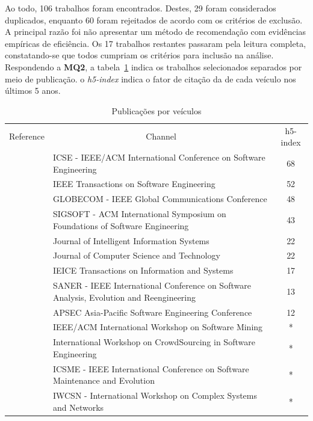 \documentclass[12pt,openany,oneside,a4paper,english,brazil]{abntbibufjf}
\begin{document}
Ao todo, 106 trabalhos foram encontrados. Destes, 29 foram considerados duplicados, enquanto 60 foram rejeitados de acordo com os critérios de exclusão. A principal razão foi não apresentar um método de recomendação com evidências empíricas de eficiência. Os 17 trabalhos restantes passaram pela leitura completa, constatando-se que todos cumpriam os critérios para inclusão na análise. Respondendo a \textbf{MQ2}, a tabela~\ref{tab:papersperchannel} indica os trabalhos selecionados separados por meio de publicação. o \textit{h5-index} indica o fator de citação da de cada veículo nos últimos 5 anos.


\begin{table}[!htbp]
  \tiny
  \begin{center}
  \caption{Publicações por veículos }
  \label{tab:papersperchannel}
    \begin{tabularx}{\textwidth}{cXc}
    \hline\noalign{\smallskip}
    Reference         & \multicolumn{1}{c}{Channel} & h5-index \\
    \noalign{\smallskip}
    \hline
    \noalign{\smallskip}
    \cite{rahman2016}\cite{balachandran2013}  & ICSE - IEEE/ACM International Conference on Software Engineering & 68                                  \\
    \cite{zanjani2016} & IEEE Transactions on Software Engineering & 52 \\
    \cite{liao2017} & GLOBECOM - IEEE Global Communications Conference & 48 \\
    \cite{costa2016} & SIGSOFT - ACM International Symposium on Foundations of Software Engineering & 43 \\
    \cite{fejzer2017} & Journal of Intelligent Information Systems  & 22 \\
    \cite{jiang2015} & Journal of Computer Science and Technology & 22\\
    \cite{yang2016} &  IEICE Transactions on Information and Systems & 17 \\
    \cite{Thongtanunam2015-1}  & SANER - IEEE International Conference on Software Analysis, Evolution and Reengineering & 13                                 \\
    \cite{yu2014,lee2013} & APSEC Asia-Pacific Software Engineering Conference & 12  \\
    \cite{xia2017} & IEEE/ACM International Workshop on Software Mining & * \\
    \cite{ying2016} &  International Workshop on CrowdSourcing in Software Engineering & *\\
    \cite{yu2014-2}\cite{xia2015}\cite{ouni2016} & ICSME -  IEEE International Conference on Software Maintenance and Evolution  & *\\
    \cite{fu2017} & IWCSN - International Workshop on Complex Systems and Networks & * \\
    \hline
  \end{tabularx}
  \end{center}
\end{table}
\end{document}
